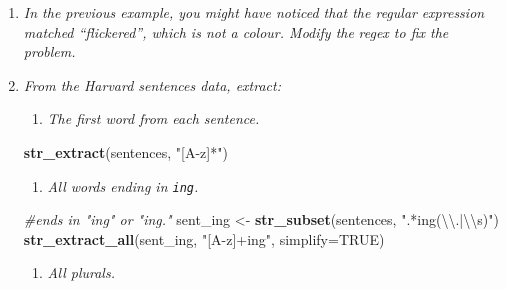 \documentclass[]{book}
\newenvironment{Shaded}{\begin{snugshade}}{\end{snugshade}}
\newcommand{\CharTok}[1]{\textcolor[rgb]{0.31,0.60,0.02}{#1}}
\newcommand{\CommentTok}[1]{\textcolor[rgb]{0.56,0.35,0.01}{\textit{#1}}}
\newcommand{\DataTypeTok}[1]{\textcolor[rgb]{0.13,0.29,0.53}{#1}}
\newcommand{\KeywordTok}[1]{\textcolor[rgb]{0.13,0.29,0.53}{\textbf{#1}}}
\newcommand{\NormalTok}[1]{#1}
\newcommand{\OtherTok}[1]{\textcolor[rgb]{0.56,0.35,0.01}{#1}}
\newcommand{\StringTok}[1]{\textcolor[rgb]{0.31,0.60,0.02}{#1}}
\providecommand{\tightlist}{%
  \setlength{\itemsep}{0pt}\setlength{\parskip}{0pt}}
\theoremstyle{definition}
\theoremstyle{definition}
\theoremstyle{definition}
\theoremstyle{remark}
\begin{document}
\begin{enumerate}
\def\labelenumi{\arabic{enumi}.}
\item
  \emph{In the previous example, you might have noticed that the
  regular} \emph{expression matched ``flickered'', which is not a
  colour. Modify the } \emph{regex to fix the problem.}
\item
  \emph{From the Harvard sentences data, extract:}

  \begin{enumerate}
  \def\labelenumii{\arabic{enumii}.}
  \tightlist
  \item
    \emph{The first word from each sentence.}
  \end{enumerate}

\begin{Shaded}
\begin{Highlighting}[]
\KeywordTok{str_extract}\NormalTok{(sentences, }\StringTok{"[A-z]*"}\NormalTok{)}
\end{Highlighting}
\end{Shaded}

  \begin{enumerate}
  \def\labelenumii{\arabic{enumii}.}
  \setcounter{enumii}{1}
  \tightlist
  \item
    \emph{All words ending in \texttt{ing}.}
  \end{enumerate}

\begin{Shaded}
\begin{Highlighting}[]
\CommentTok{#ends in "ing" or "ing."}
\NormalTok{sent_ing <-}\StringTok{ }\KeywordTok{str_subset}\NormalTok{(sentences, }\StringTok{".*ing(}\CharTok{\textbackslash{}\textbackslash{}}\StringTok{.|}\CharTok{\textbackslash{}\textbackslash{}}\StringTok{s)"}\NormalTok{)  }
\KeywordTok{str_extract_all}\NormalTok{(sent_ing, }\StringTok{"[A-z]+ing"}\NormalTok{, }\DataTypeTok{simplify=}\OtherTok{TRUE}\NormalTok{)}
\end{Highlighting}
\end{Shaded}

  \begin{enumerate}
  \def\labelenumii{\arabic{enumii}.}
  \setcounter{enumii}{2}
  \tightlist
  \item
    \emph{All plurals.}
  \end{enumerate}


\end{enumerate}
\end{document}
